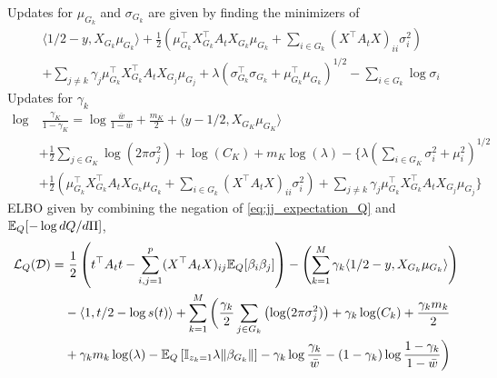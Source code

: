 \documentclass[12pt]{article}
\begin{document}
Updates for $\mu_{G_k}$ and $\sigma_{G_k}$ are given by finding the minimizers of 
\begin{equation}
\begin{aligned}
    & 
    \langle 1/2 - y,  X_{G_k} \mu_{G_k} \rangle 
    + \frac{1}{2} \left( 
	\mu_{G_k}^\top X_{G_k}^\top A_t X_{G_k} \mu_{G_k} 
	+ \sum_{i \in G_k} (X^\top A_t X)_{ii} \sigma_{i}^2 
    \right)
    \\
    & 
    + \sum_{j \neq k} \gamma_j \mu_{G_k}^\top X_{G_k}^\top A_t X_{G_j} \mu_{G_j} 
    + \lambda \left( \sigma_{G_k}^\top \sigma_{G_k} + \mu_{G_k}^\top \mu_{G_k} \right)^{1/2} 
    - \sum_{i \in G_k}\log{\sigma_i}
\end{aligned}
\end{equation}
Updates for $\gamma_k$
\begin{equation}
\begin{aligned}
    \log &\ \frac{\gamma_K}{1-\gamma_K} = 
    \log \frac{\bar{w}}{1-\bar{w}}
    + \frac{m_K}{2}  
    + \langle y - 1/2, X_{G_K} \mu_{G_K} \rangle  
    \\
    &
    + \frac{1}{2} \sum_{j \in G_K} \log \left( 2 \pi \sigma_j^2 \right)
    + \log(C_K)
    + m_K \log (\lambda)
    - \Bigg\{ 
    \lambda \left( \sum_{i \in G_K} \sigma_i^2 + \mu_i^2 \right)^{1/2}  
    \\
    &
    + \frac{1}{2} \left( 
	\mu_{G_k}^\top X_{G_k}^\top A_t X_{G_k} \mu_{G_k} 
	+ \sum_{i \in G_k} (X^\top A_t X)_{ii} \sigma_{i}^2 
    \right)
    + \sum_{j \neq k} \gamma_j \mu_{G_k}^\top X_{G_k}^\top A_t X_{G_j} \mu_{G_j} 
\Bigg\}
\end{aligned}
\end{equation}
ELBO given by combining the negation of \eqref{eq:jj_expectation_Q} and $\mathbb{E}_Q[ - \log dQ / d\Pi]$,
\begin{equation}
\begin{aligned}
\mathcal{L}_Q(\mathcal{D}) =
    &\
    \frac{1}{2}
    \left(
	t^\top A_t t
	- \sum_{i,j=1}^p (X^\top A_t X)_{ij} \mathbb{E}_Q [ \beta_i \beta_j ]
    \right)
    - \left(
    \sum_{k = 1}^M 
	\gamma_k \langle 1/2 - y,  X_{G_k} \mu_{G_k} \rangle 
    \right) 
    \\
    &
    - \langle 1, t/2 - \log s(t) \rangle
    + \sum_{k=1}^M \bigg(  
	\frac{\gamma_k}{2} \sum_{j \in G_k} \left( \log( 2 \pi \sigma_j^2) \right)
	+ \gamma_k \log(C_k)
	+ \frac{\gamma_k m_k}{2} 
    \\
    &
	+ \gamma_k m_k \log (\lambda)
	- \mathbb{E}_Q \left[ \mathbb{I}_{z_k =1} \lambda \| \beta_{G_k} \| \right]
	- \gamma_k \log \frac{\gamma_k}{\bar{w}}
	- (1-\gamma_k) \log \frac{1 - \gamma_k}{1 - \bar{w}} 
    \bigg)
\end{aligned}
\end{equation}
\end{document}
